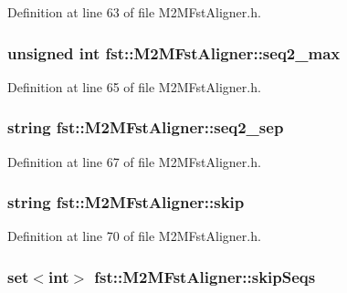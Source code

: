 Definition at line 63 of file M2\+M\+Fst\+Aligner.\+h.

\subsubsection[{seq2\+\_\+max}]{\setlength{\rightskip}{0pt plus 5cm}unsigned int fst\+::\+M2\+M\+Fst\+Aligner\+::seq2\+\_\+max}\hypertarget{classfst_1_1_m2_m_fst_aligner_a5317b10db862b4f09b34e71b253b24c6}{}\label{classfst_1_1_m2_m_fst_aligner_a5317b10db862b4f09b34e71b253b24c6}


Definition at line 65 of file M2\+M\+Fst\+Aligner.\+h.

\subsubsection[{seq2\+\_\+sep}]{\setlength{\rightskip}{0pt plus 5cm}string fst\+::\+M2\+M\+Fst\+Aligner\+::seq2\+\_\+sep}\hypertarget{classfst_1_1_m2_m_fst_aligner_a959c82581fc3a8a2a5999cc4daee123d}{}\label{classfst_1_1_m2_m_fst_aligner_a959c82581fc3a8a2a5999cc4daee123d}


Definition at line 67 of file M2\+M\+Fst\+Aligner.\+h.

\subsubsection[{skip}]{\setlength{\rightskip}{0pt plus 5cm}string fst\+::\+M2\+M\+Fst\+Aligner\+::skip}\hypertarget{classfst_1_1_m2_m_fst_aligner_a6632333cec0394fdb012ac60b91817ce}{}\label{classfst_1_1_m2_m_fst_aligner_a6632333cec0394fdb012ac60b91817ce}


Definition at line 70 of file M2\+M\+Fst\+Aligner.\+h.

\subsubsection[{skip\+Seqs}]{\setlength{\rightskip}{0pt plus 5cm}set$<$int$>$ fst\+::\+M2\+M\+Fst\+Aligner\+::skip\+Seqs}\hypertarget{classfst_1_1_m2_m_fst_aligner_adf30d66ed3320bb5f0d5c18a08861a3b}{}\label{classfst_1_1_m2_m_fst_aligner_adf30d66ed3320bb5f0d5c18a08861a3b}


